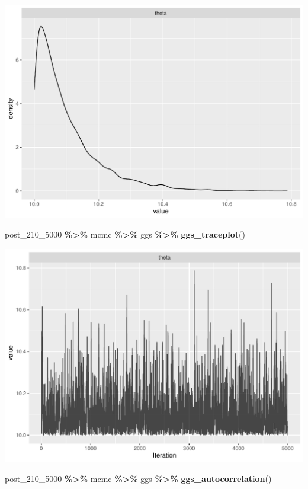 \documentclass[
]{article}
\newenvironment{Shaded}{\begin{snugshade}}{\end{snugshade}}
\newcommand{\FunctionTok}[1]{\textcolor[rgb]{0.13,0.29,0.53}{\textbf{#1}}}
\newcommand{\NormalTok}[1]{#1}
\newcommand{\SpecialCharTok}[1]{\textcolor[rgb]{0.81,0.36,0.00}{\textbf{#1}}}
\begin{document}
\begin{center}\includegraphics[width=0.8\linewidth]{Bayes_stat_hw3_files/figure-latex/unnamed-chunk-39-1} \end{center}

\begin{Shaded}
\begin{Highlighting}[]
\NormalTok{post\_210\_5000 }\SpecialCharTok{\%\textgreater{}\%}\NormalTok{ mcmc }\SpecialCharTok{\%\textgreater{}\%}\NormalTok{ ggs }\SpecialCharTok{\%\textgreater{}\%} \FunctionTok{ggs\_traceplot}\NormalTok{()}
\end{Highlighting}
\end{Shaded}

\begin{center}\includegraphics[width=0.8\linewidth]{Bayes_stat_hw3_files/figure-latex/unnamed-chunk-39-2} \end{center}

\begin{Shaded}
\begin{Highlighting}[]
\NormalTok{post\_210\_5000 }\SpecialCharTok{\%\textgreater{}\%}\NormalTok{ mcmc }\SpecialCharTok{\%\textgreater{}\%}\NormalTok{ ggs }\SpecialCharTok{\%\textgreater{}\%} \FunctionTok{ggs\_autocorrelation}\NormalTok{()}
\end{Highlighting}
\end{Shaded}
\end{document}
